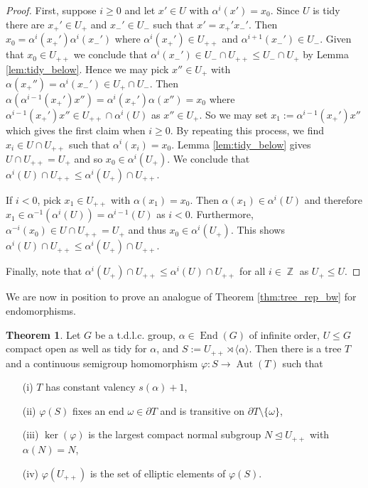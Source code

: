 \documentclass{article}
\DeclareMathOperator\End{End}
\DeclareMathOperator\Aut{Aut}
\DeclareMathOperator\bbZ{\mathbb{Z}}
\theoremstyle{definition}
\newtheorem{theorem}{Theorem}[section]
\begin{document}
\begin{proof}
First, suppose $i\ge 0$ and let $x'\in U$ with $\alpha^{i}(x')=x_{0}$. Since $U$ is tidy there are $x_{+}'\in U_{+}$ and $x_{-}'\in U_{-}$ such that $x'=x_{+}'x_{-}'$. Then $x_{0}=\alpha^{i}(x_{+}')\alpha^{i}(x_{-}')$ where $\alpha^{i}(x_{+}')\in U_{++}$ and $\alpha^{i+1}(x_{-}')\in U_{-}$. Given that $x_{0}\in U_{++}$ we conclude that $\alpha^{i}(x_{-}')\in U_{-}\cap U_{++}\le U_{-}\cap U_{+}$ by Lemma \ref{lem:tidy_below}. Hence we may pick $x''\in U_{+}$ with $\alpha(x_{+}'')=\alpha^{i}(x_{-}')\in U_{+}\cap U_{-}$. Then $\alpha(\alpha^{i-1}(x_{+}')x'')=\alpha^{i}(x_{+}')\alpha(x'')=x_{0}$ where $\alpha^{i-1}(x_{+}')x''\in U_{++}\cap\alpha^{i}(U)$ as $x''\in U_{+}$. So we may set $x_{1}:=\alpha^{i-1}(x_{+}')x''$ which gives the first claim when $i \ge 0$.
By repeating this process, we find $x_i\in U\cap U_{++}$ such that $\alpha^i(x_i) = x_0$. Lemma \ref{lem:tidy_below} gives $U\cap U_{++} = U_{+}$ and so $x_0\in \alpha^i(U_+)$. We conclude that $\alpha^i(U)\cap U_{++}\le \alpha^{i}(U_+)\cap U_{++}$.

If $i<0$, pick $x_{1}\in U_{++}$ with $\alpha(x_{1})=x_{0}$. Then $\alpha(x_{1})\in\alpha^{i}(U)$ and therefore $x_{1}\in\alpha^{-1}(\alpha^{i}(U))=\alpha^{i-1}(U)$ as $i<0$. Furthermore, $\alpha^{-i}(x_0)\in U\cap U_{++} = U_{+}$ and thus $x_0\in \alpha^{i}(U_+)$. This shows $\alpha^i(U)\cap U_{++}\le \alpha^{i}(U_+)\cap U_{++}$. 

Finally, note that $\alpha^{i}(U_+)\cap U_{++}\le \alpha^i(U)\cap U_{++}$ for all $i\in\bbZ$ as $U_{+}\le U$.
\end{proof}

We are now in position to prove an analogue of Theorem \ref{thm:tree_rep_bw} for endomorphisms.

\begin{theorem}\label{thm:tree_rep_thm}
Let $G$ be a t.d.l.c. group, $\alpha\!\in\!\End(G)$ of infinite order, $U\le G$ compact open as well as tidy for $\alpha$, and $S:=U_{++}\rtimes\langle\alpha\rangle$. Then there is a tree $T$ and a continuous semigroup homomorphism $\varphi:S\to\Aut(T)$ such that
\begin{itemize}
  \item[(i)] $T$ has constant valency $s(\alpha)+1$,
  \item[(ii)] $\varphi(S)$ fixes an end $\omega\in\partial T$ and is transitive on $\partial T\setminus \{\omega\}$,	
  \item[(iii)] $\ker(\varphi)$ is the largest compact normal subgroup $N\unlhd U_{++}$ with $\alpha(N)=N$,
  \item[(iv)] $\varphi(U_{++})$ is the set of elliptic elements of $\varphi(S)$.
\end{itemize}
\end{theorem}
\end{document}
